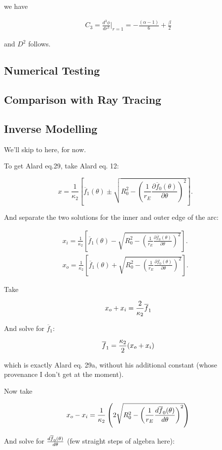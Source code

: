 \documentclass{article}
\def\be{\begin{equation}}
\def\ee{\end{equation}}
\def\bea{\begin{eqnarray}}
\def\eea{\end{eqnarray}}
\newcommand{\rp}{\right)}
\newcommand{\lp}{\left(}
\def\dfdt{{d \overline{f}_0(\theta) \over d \theta}}
\def\fbar{\overline{f}_1}
\begin{document}
we have

\bea
C_3=\frac{d^3\phi}{dr^3}|_{r=1}=-\frac{(\alpha-1)}{6}+\frac{\beta}{2}
\eea

and $D^2$ follows. 

\subsection{Numerical Testing}

\subsection{Comparison with Ray Tracing}

\subsection{Inverse Modelling}

We'll skip to here, for now.

To get Alard eq.29, take Alard eq. 12:


\be
x = \frac{1}{\kappa_2}\left[ \overline{f}_{1}(\theta) \pm \sqrt{R_0^2 - \left( \frac{1}{r_E}\frac{\partial \overline{f}_0(\theta)}{\partial \theta} \right)^2} \right]. \;\;\; 
\ee

And separate the two solutions for the inner and outer edge of the arc:



\bea
x_i = \frac{1}{\kappa_2}\left[ \overline{f}_{1}(\theta) - \sqrt{R_0^2 - \left( \frac{1}{r_E}\frac{\partial \overline{f}_0(\theta)}{\partial \theta} \right)^2} \right]. \;\;\;  \\
x_o = \frac{1}{\kappa_2}\left[ \overline{f}_{1}(\theta) + \sqrt{R_0^2 - \left( \frac{1}{r_E}\frac{\partial \overline{f}_0(\theta)}{\partial \theta} \right)^2} \right]. \;\;\;  
\eea


Take 

\be
x_o + x_i = {2 \over \kappa_2} \fbar 
\ee

And solve for $\fbar$:


\be
\fbar = {\kappa_2 \over 2} (x_o+x_i)
\ee

which is exactly Alard eq. 29a, without his additional constant (whose provenance I don't get at the moment).

Now take 

\be
x_o - x_i = {1 \over \kappa_2} \lp 2 \sqrt{R_0^2 - {\lp {1 \over r_E} \dfdt \rp}^2 }\rp
\ee

And solve for $\dfdt$ (few straight steps of algebra here):
\end{document}
